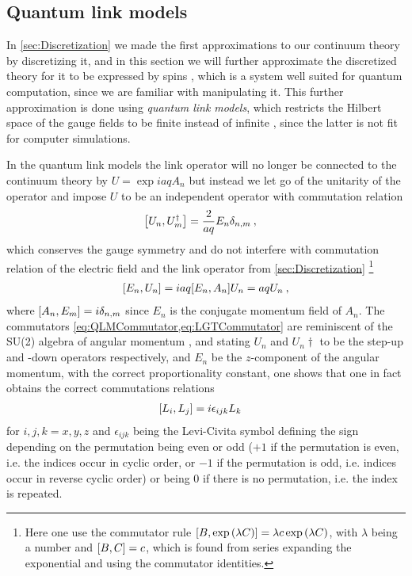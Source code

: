 \documentclass[../main.tex]{subfiles} %
\begin{document}
\subsection{Quantum link models}

In \cref{sec:Discretization} we made the first approximations to our continuum theory by discretizing it, and in this section we will further approximate the discretized theory for it to be expressed by spins \cite{Hauke_QLM_2013}, which is a system well suited for quantum computation, since we are familiar with manipulating it. This further approximation is done using \emph{quantum link models}, which restricts the Hilbert space of the gauge fields to be finite instead of infinite \cite{Barros_GaugeTheoriesWithUltracoldAtoms_2020}, since the latter is not fit for computer simulations.

In the quantum link models the link operator will no longer be connected to the continuum theory by $U = \exp{iaqA_n}$ but instead we let go of the unitarity of the operator and impose $U$ to be an independent operator with commutation relation \cite{panyella_masterThesis_2019}
\begin{align} \label{eq:QLMCommutator}
    \commutator{U_n}{U_m\dagger} &= \frac{2}{aq} E_n \delta_{n,m} \: ,
\end{align}
which conserves the gauge symmetry and do not interfere with commutation relation of the electric field and the link operator from \cref{sec:Discretization} \cite{panyella_masterThesis_2019} \footnote{Here one use the commutator rule $\commutator{B}{\exp{\lambda C}} = \lambda c \exp{\lambda C} $, with $\lambda$ being a number and $\commutator{B}{C} = c$, which is found from series expanding the exponential and using the commutator identities.}
\begin{align} \label{eq:LGTCommutator}
    \commutator{E_n}{U_n} = iaq \commutator{E_n}{A_n} U_n = aq U_n \: ,
\end{align}
where $\commutator{A_n}{E_m} = i \delta_{n,m}$ since $E_n$ is the conjugate momentum field of $A_n$. The commutators \cref{eq:QLMCommutator,eq:LGTCommutator} are reminiscent of the SU(2) algebra of angular momentum \cite{Barros_GaugeTheoriesWithUltracoldAtoms_2020, widmer_PhD_2dQuantumLinkModels_2015}, and stating $U_n$ and $U_n\dagger$ to be the step-up and -down operators respectively, and $E_n$ be the $z$-component of the angular momentum, with the correct proportionality constant, one shows that one in fact obtains the correct commutations relations
\begin{align}
    \commutator{L_i}{L_j} &= i \epsilon_{ijk}L_k
\end{align}
for $i,j,k = x,y,z$ and $\epsilon_{ijk}$ being the Levi-Civita symbol defining the sign depending on the permutation being even or odd ($+1$ if the permutation is even, i.e. the indices occur in cyclic order, or $-1$ if the permutation is odd, i.e. indices occur in reverse cyclic order) or being $0$ if there is no permutation, i.e. the index is repeated.
\end{document}
